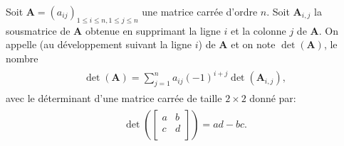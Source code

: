 \documentclass[letterpaper,11pt,english]{sphinxmanual}
\begin{document}
\sphinxAtStartPar
Soit \(\mathbf{A}=(a_{ij})_{1\le i\le n, 1\le j\le n}\) une matrice
carrée d’ordre \(n\). Soit \(\mathbf{A}_{i,j}\) la sous\sphinxhyphen{}matrice
de \(\mathbf{A}\) obtenue en supprimant la ligne \(i\) et la
colonne \(j\) de \(\mathbf{A}\). On appelle  (au
développement suivant la ligne \(i\)) de \(\mathbf{A}\) et on
note \(\operatorname{det}(\mathbf{A})\), le nombre
\begin{equation}\label{equation:chapter2:chapter2:7}
\begin{split}\begin{aligned}
    \operatorname{det}(\mathbf{A}) = \sum_{j=1}^{n}a_{ij}(-1)^{i+j}\operatorname{det}(\mathbf{A}_{i,j}),\end{aligned}\end{split}
\end{equation}
\sphinxAtStartPar
avec le déterminant d’une matrice carrée de taille \(2\times 2\)
donné par:
\begin{equation}\label{equation:chapter2:chapter2:8}
\begin{split}\begin{aligned}
    \operatorname{det} \left(\begin{bmatrix}
a & b\\
c & d\\
\end{bmatrix}\right) = ad-bc.\end{aligned}\end{split}
\end{equation}
\end{document}
